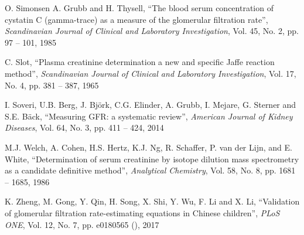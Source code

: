 \documentclass[10pt,final]{siamltex}
\begin{document}
\begin{thebibliography}{99}
   O. Simonsen A. Grubb and H. Thysell, ``The blood serum concentration of cystatin C (gamma-trace) as a measure of the glomerular filtration rate'', \textit{Scandinavian Journal of Clinical and Laboratory Investigation}, Vol. 45, No. 2, pp. 97 -- 101, 1985

   C. Slot, ``Plasma creatinine determination a new and specific Jaffe reaction method'', \textit{Scandinavian Journal of Clinical and Laboratory Investigation}, Vol. 17, No. 4, pp. 381 -- 387, 1965

   I. Soveri, U.B. Berg, J. Bj\"{o}rk, C.G. Elinder, A. Grubb, I. Mejare, G. Sterner and S.E. B\"{a}ck, ``Measuring GFR: a systematic review'', \textit{American Journal of Kidney Diseases}, Vol. 64, No. 3, pp. 411 -- 424, 2014

   M.J. Welch, A. Cohen, H.S. Hertz, K.J. Ng, R. Schaffer, P. van der Lijn, and E. White, ``Determination of serum creatinine by isotope dilution mass spectrometry as a candidate definitive method'', \textit{Analytical Chemistry}, Vol. 58, No. 8, pp. 1681 -- 1685, 1986

   K. Zheng, M. Gong, Y. Qin, H. Song, X. Shi, Y. Wu, F. Li and X. Li, ``Validation of glomerular filtration rate-estimating equations in Chinese children'', \textit{PLoS ONE}, Vol. 12, No. 7, pp. e0180565 (), 2017
\end{thebibliography}
\end{document}
